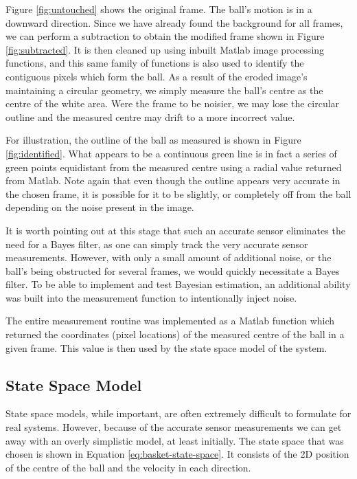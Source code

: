 Figure \ref{fig:untouched} shows the original frame. The ball's motion is in
a downward direction. Since we have already found the background for all frames,
we can perform a subtraction to obtain the modified frame shown in Figure
\ref{fig:subtracted}. It is then cleaned up using inbuilt Matlab image processing
functions, and this same family of functions is also used to identify the contiguous
pixels which form the ball. As a result of the eroded image's maintaining
a circular geometry, we simply measure the ball's centre as the centre of the
white area. Were the frame to be noisier, we may lose the circular outline and
the measured centre may drift to a more incorrect value.

For illustration, the outline of the ball as measured is shown in Figure
\ref{fig:identified}. What appears to be a continuous green line is in fact
a series of green points equidistant from the measured centre using a radial
value returned from Matlab. Note again that even though the outline appears
very accurate in the chosen frame, it is possible for it to be slightly, or
completely off from the ball depending on the noise present in the image.

It is worth pointing out at this stage that such an accurate sensor eliminates
the need for a Bayes filter, as one can simply track the very accurate sensor
measurements. However, with only a small amount of additional noise, or the ball's
being obstructed for several frames, we would quickly necessitate a Bayes filter.
To be able to implement and test Bayesian estimation, an additional ability was
built into the measurement function to intentionally inject noise. 

The entire measurement routine was implemented as a Matlab function which
returned the coordinates (pixel locations) of the measured centre of the ball
in a given frame. This value is then used by the state space model of the system.

\subsection{State Space Model}
State space models, while important, are often extremely difficult to formulate
for real systems. However, because of the accurate sensor measurements we can
get away with an overly simplistic model, at least initially. The state space
that was chosen is shown in Equation \ref{eq:basket-state-space}. It consists
of the 2D position of the centre of the ball and the velocity in each direction.

